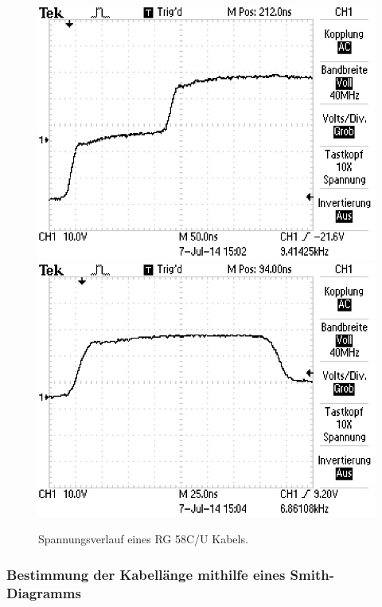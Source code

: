 \begin{figure}
\centering
	\includegraphics[width = 12cm]{data/c/ALL0011/F0011TEK.jpg}
	\includegraphics[width = 12cm]{data/c/ALL0012/F0012TEK.jpg}
	\caption{Spannungsverlauf eines RG 58C/U Kabels.}
	\label{fig_zeit3}
\end{figure}

\FloatBarrier
\subsubsection{Bestimmung der Kabellänge mithilfe eines Smith-Diagramms} %
\label{sub:bestimmung_der_kabellaenge_mithilfe_eines_smith_diagramms}

